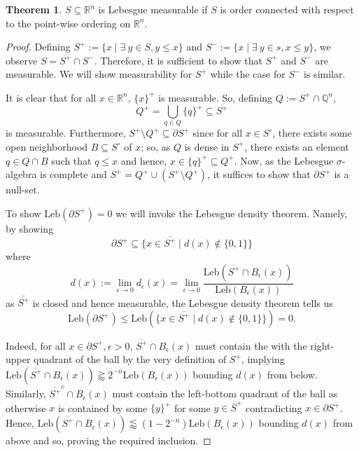 \documentclass[]{article}
\theoremstyle{definition}
\newtheorem*{theorem*}{Theorem}
\theoremstyle{definition}
\begin{document}
\begin{theorem*}
  \(S \subseteq \mathbb{R}^n\) is Lebesgue measurable if \(S\) is order connected with respect to the 
  point-wise ordering on \(\mathbb{R}^n\).
\end{theorem*} 
\begin{proof}
  Defining \(S^+ := \{x \mid \exists \ y \in S, y \le x\}\) and \(S^- := \{x \mid \exists \ y \in s, x \le y\}\), we 
  observe \(S = S^+ \cap S^-\). Therefore, it is sufficient to show that \(S^+\) and \(S^-\) are measurable. 
  We will show measurability for \(S^+\) while the case for \(S^-\) is similar. 

  It is clear that for all \(x \in \mathbb{R}^n\), \(\{x\}^+\) is measurable. So, defining \(Q := S^+ \cap \mathbb{Q}^n\),
  \[Q^+ = \bigcup_{q \in Q} \{q\}^+ \subseteq S^+\]
  is measurable. Furthermore, \(S^+ \setminus Q^+ \subseteq \partial S^+\) since for all \(x \in S^\circ\), there exists some 
  open neighborhood \(B \subseteq S^\circ\) of \(x\); so, as \(Q\) is dense in \(S^+\), there exists an element 
  \(q \in Q \cap B\) such that \(q \le x\) and hence, \(x \in \{q\}^+ \subseteq Q^+\). Now, as the Lebesgue \(\sigma\)-algebra is 
  complete and \(S^+ = Q^+ \cup (S^+ \setminus Q^+)\), it suffices to show that \(\partial S^+\) is a null-set.

  To show \(\text{Leb}(\partial S^+) = 0\) we will invoke the Lebesgue density theorem. Namely, by showing 
  \[\partial S^+ \subseteq \{x \in \overline{S^+} \mid d(x) \notin \{0, 1\}\}\]
  where 
  \[d(x) := \lim_{\epsilon \to 0} d_\epsilon(x) = \lim_{\epsilon \to 0} 
    \frac{\text{Leb}(\overline{S^+} \cap B_\epsilon(x))}{\text{Leb}(B_\epsilon(x))}\]
  as \(\overline{S^+}\) is closed and hence measurable, the Lebesgue density theorem tells us 
  \[\text{Leb}(\partial S^+) \le \text{Leb}(\{x \in \overline{S^+} \mid d(x) \notin \{0, 1\}\}) = 0.\]
  
  Indeed, for all \(x \in \partial S^+, \epsilon > 0\), \(\overline{S^+} \cap B_\epsilon(x)\) must contain 
  the with the right-upper quadrant of the ball by the very definition of \(S^+\), implying 
  \(\text{Leb}(\overline{S^+} \cap B_\epsilon(x)) \gtrapprox 2^{-n} \text{Leb}(B_\epsilon(x))\) bounding 
  \(d(x)\) from below. Similarly, \(\overline{S^+}^c \cap B_\epsilon(x)\) must contain the left-bottom 
  quadrant of the ball as otherwise \(x\) is contained by some \(\{y\}^+\) for some \(y \in \overline{S}^+\) 
  contradicting \(x \in \partial S^+\). Hence, \(\text{Leb}(\overline{S^+} \cap B_\epsilon(x)) \lessapprox 
  (1 - 2^{-n}) \text{Leb}(B_\epsilon(x))\) bounding \(d(x)\) from above and so, proving the required 
  inclusion.
\end{proof}
\end{document}
